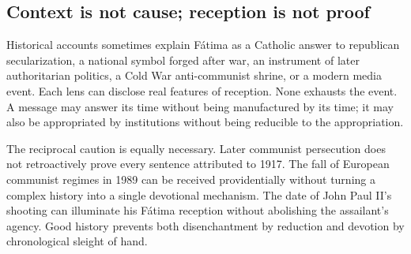 \subsection{Context is not cause; reception is not proof}

Historical accounts sometimes explain Fátima as a Catholic answer to republican secularization, a national symbol forged after war, an instrument of later authoritarian politics, a Cold War anti-communist shrine, or a modern media event. Each lens can disclose real features of reception. None exhausts the event. A message may answer its time without being manufactured by its time; it may also be appropriated by institutions without being reducible to the appropriation.

The reciprocal caution is equally necessary. Later communist persecution does not retroactively prove every sentence attributed to 1917. The fall of European communist regimes in 1989 can be received providentially without turning a complex history into a single devotional mechanism. The date of John Paul II's shooting can illuminate his Fátima reception without abolishing the assailant's agency. Good history prevents both disenchantment by reduction and devotion by chronological sleight of hand.
